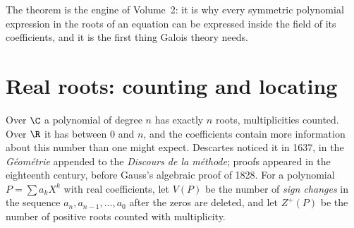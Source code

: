 The theorem is the engine of Volume~2: it is why every symmetric polynomial expression in the roots of an equation can be expressed inside the field of its
coefficients, and it is the first thing Galois theory needs.

\section{Real roots: counting and locating}

Over $\C$ a polynomial of degree $n$ has exactly $n$ roots, multiplicities counted. Over $\R$ it has between $0$ and $n$, and the coefficients
contain more information about this number than one might expect. Descartes noticed it in 1637, in the \emph{G\'eom\'etrie} appended to the
\emph{Discours de la m\'ethode}; proofs appeared in the eighteenth century, before Gauss's algebraic proof of 1828. For a polynomial $P=\sum a_kX^k$ with real coefficients, let $V(P)$ be the
number of \emph{sign changes} in the sequence $a_n,a_{n-1},\dots,a_0$ after the zeros are deleted, and let $Z^+(P)$ be the number of positive roots
counted with multiplicity.

